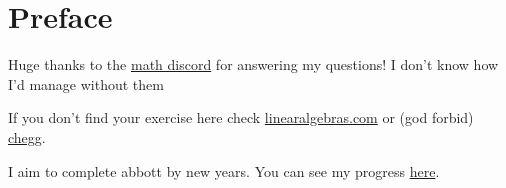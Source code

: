 \documentclass[titlepage,12pt]{book}
\begin{document}
\maketitle
\frontmatter

\chapter*{Preface}
Huge thanks to the \href{https://discord.com/invite/math}{math discord} for answering my questions! I don't know how I'd manage without them \heart
\par

If you don't find your exercise here check \href{https://linearalgebras.com/solution-understanding-analysis.html}{linearalgebras.com} or (god forbid) \href{https://www.chegg.com/homework-help/understanding-analysis-2nd-edition-solutions-9781493927111}{chegg}.
\par
I aim to complete abbott by new years. You can see my progress \href{https://www.beeminder.com/valvate/abbott-exercises}{here}.

\tableofcontents
\mainmatter


\end{document}
